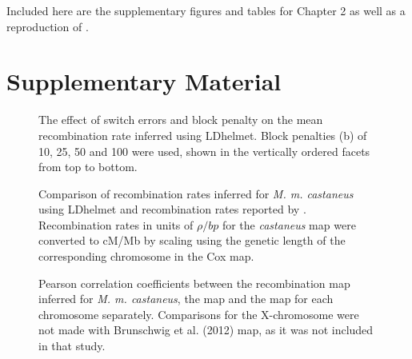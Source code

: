 
Included here are the supplementary figures and tables for Chapter 2 as well as a reproduction of \cite{RN340}.

\section{Supplementary Material}

\linespread{1}




\pagebreak 
 
 \begin{figure}
   \centering      
   \noindent{}
 \caption[The effect of block penalty on recombination rate inference]{The effect of switch errors and block penalty on the mean recombination rate inferred using LDhelmet. Block penalties (b) of 10, 25, 50 and 100 were used, shown in the vertically ordered facets from top to bottom.}
 \label{fig:C2SF1}
\end{figure}

 
 \begin{figure}
   \centering      
   \noindent{}
 \caption[Recombination rates maps for each mouse chromosome]{Comparison of recombination rates inferred for \textit{M. m. castaneus} using LDhelmet
 and recombination rates reported by \cite{RN232}. Recombination rates in units of $\rho / bp$
 for the \textit{castaneus} map were converted to cM/Mb by scaling using the genetic length of the
 corresponding chromosome in the Cox map.}
 \label{fig:C2SF2}
\end{figure}


 \begin{figure}
   \centering      
   \noindent{}
 \caption[Correlations between recombination maps for each chromosome]{Pearson correlation coefficients between the recombination map inferred for \textit{M. m. castaneus}, the \cite{RN156} map and the \cite{RN232} map for each chromosome separately. Comparisons for the X-chromosome were not made with Brunschwig et al. (2012) map, as it was not included in that study.}
 \label{fig:C2SF3}
\end{figure}
 
